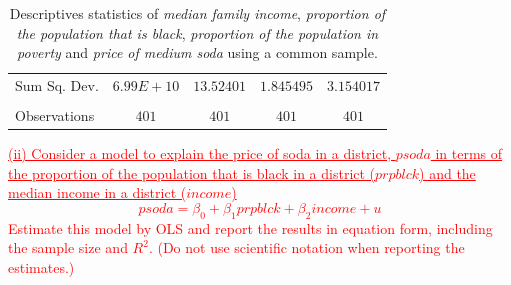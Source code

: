 \documentclass[12pt]{report}
\begin{document}
\begin{table}[H]
\begin{tabular}{lrrrr}
		\multicolumn{1}{l}{Sum Sq. Dev.}&\multicolumn{1}{c}{$6.99E+10$}&\multicolumn{1}{c}{$13.52401$}&\multicolumn{1}{c}{$1.845495$}&\multicolumn{1}{c}{$3.154017$}\\
		\multicolumn{1}{c}{}&\multicolumn{1}{c}{}&\multicolumn{1}{c}{}&\multicolumn{1}{c}{}&\multicolumn{1}{c}{}\\
		\multicolumn{1}{l}{Observations}&\multicolumn{1}{c}{$401$}&\multicolumn{1}{c}{$401$}&\multicolumn{1}{c}{$401$}&\multicolumn{1}{c}{$401$}\\
	\end{tabular}
	\caption{Descriptives statistics of \textit{median family income}, \textit{proportion of the population that is black}, \textit{proportion of the population in poverty} and \textit{price of medium soda} using a common sample.}
\end{table}
\vspace{-\baselineskip}
\noindent \textcolor{red}
{
	\ul{(ii) Consider a model to explain the price of soda in a district, $psoda$ in terms of the proportion of the population that is black in a district ($prpblck$) and the median income in a district ($income$)} $$psoda = \beta_0 + \beta_1prpblck + \beta_2income + u$$ Estimate this model by OLS and report the results in equation form, including the sample size and $R^2$. (Do not use scientific notation when reporting the estimates.)
}
\end{document}

